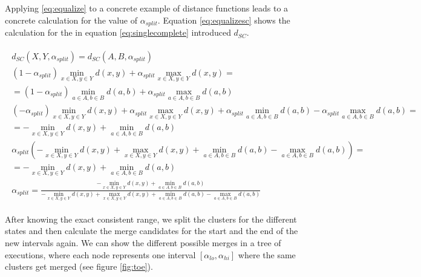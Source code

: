 Applying \ref{eq:equalize} to a concrete example of distance functions leads to a concrete calculation for the value of $\alpha_{split}$. Equation \ref{eq:equalizesc} shows the calculation for the in equation \ref{eq:singlecomplete} introduced $d_{SC}$.

\begin{equation}
    \begin{aligned}
        \begin{gathered}
        d_{SC}(X,Y,\alpha_{split}) = d_{SC}(A,B,\alpha_{split})\\
        (1 - \alpha_{split}) \min\limits_{x \in X, y \in Y} d(x,y) + \alpha_{split} \max\limits_{x \in X, y \in Y} d(x,y) = \\
        = (1 - \alpha_{split}) \min\limits_{a \in A, b \in B} d(a,b) + \alpha_{split} \max\limits_{a \in A, b \in B} d(a,b)\\
        (- \alpha_{split}) \min\limits_{x \in X, y \in Y} d(x,y) + \alpha_{split} \max\limits_{x \in X, y \in Y} d(x,y) + \alpha_{split} \min\limits_{a \in A, b \in B} d(a,b) - \alpha_{split} \max\limits_{a \in A, b \in B} d(a,b) =\\
        = - \min\limits_{x \in X, y \in Y} d(x,y) + \min\limits_{a \in A, b \in B} d(a,b)\\
        \alpha_{split} (- \min\limits_{x \in X, y \in Y} d(x,y) + \max\limits_{x \in X, y \in Y} d(x,y) + \min\limits_{a \in A, b \in B} d(a,b) - \max\limits_{a \in A, b \in B} d(a,b)) =\\
        = - \min\limits_{x \in X, y \in Y} d(x,y) + \min\limits_{a \in A, b \in B} d(a,b)\\
        \alpha_{split} = \frac{- \min\limits_{x \in X, y \in Y} d(x,y) + \min\limits_{a \in A, b \in B} d(a,b)}{- \min\limits_{x \in X, y \in Y} d(x,y) + \max\limits_{x \in X, y \in Y} d(x,y) + \min\limits_{a \in A, b \in B} d(a,b) - \max\limits_{a \in A, b \in B} d(a,b)}
    \end{gathered}
    \end{aligned}
    \label{eq:equalizesc}
\end{equation}

After knowing the exact consistent range, we split the clusters for the different states and then calculate the merge candidates for the start and the end of the new intervals again. We can show the different possible merges in a tree of executions, where each node represents one interval $[\alpha_{lo}, \alpha_{hi}]$ where the same clusters get merged (see figure \ref{fig:toe}).

